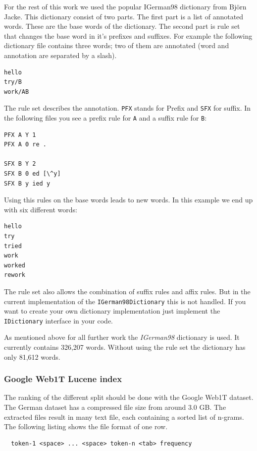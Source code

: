 \documentclass[11pt, accentcolor=tud9b, nochapname]{tudreport}
\begin{document}
For the rest of this work we used the popular IGerman98 dictionary from Björn Jacke. This dictionary consist of two parts. The first part is a list of annotated words. These are the base words of the dictionary. The second part is rule set that changes the base word in it's prefixes and suffixes. For example the following dictionary file contains three words; two of them are annotated (word and annotation are separated by a slash).

\begin{lstlisting}
hello
try/B
work/AB
\end{lstlisting}

The rule set describes the annotation. \texttt{PFX} stands for Prefix and \texttt{SFX} for suffix. In the following files you see a prefix rule for \texttt{A} and a suffix rule for \texttt{B}:

\begin{lstlisting}
PFX A Y 1
PFX A 0 re .

SFX B Y 2
SFX B 0 ed [\^y]
SFX B y ied y
\end{lstlisting}

Using this rules on the base words leads to new words. In this example we end up with six different words:

\begin{lstlisting}
hello
try
tried
work
worked
rework
\end{lstlisting}

The rule set also allows the combination of suffix rules and affix rules. But in the current implementation of the \texttt{IGerman98Dictionary} this is not handled. If you want to create your own dictionary implementation just implement the \texttt{IDictionary} interface in your code.

As mentioned above for all further work the \emph{IGerman98} dictionary is used. It currently contains 326,207 words. Without using the rule set the dictionary has only 81,612 words.

\subsubsection{Google Web1T Lucene index}
The ranking of the different split should be done with the Google Web1T dataset. The German dataset has a compressed file size from around 3.0 GB. The extracted files result in many text file, each containing a sorted list of n-grams. The following listing shows the file format of one row.

\begin{lstlisting}
  token-1 <space> ... <space> token-n <tab> frequency
\end{lstlisting}
\end{document}
